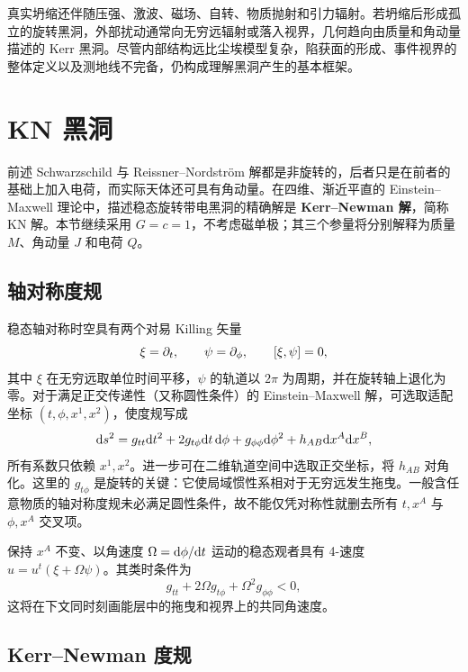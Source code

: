 真实坍缩还伴随压强、激波、磁场、自转、物质抛射和引力辐射。若坍缩后形成孤立的旋转黑洞，外部扰动通常向无穷远辐射或落入视界，几何趋向由质量和角动量描述的 Kerr 黑洞。尽管内部结构远比尘埃模型复杂，陷获面的形成、事件视界的整体定义以及测地线不完备，仍构成理解黑洞产生的基本框架。

\section{KN 黑洞}\label{sec:KN}

前述 Schwarzschild 与 Reissner--Nordstr\"om 解都是非旋转的，后者只是在前者的基础上加入电荷，而实际天体还可具有角动量。在四维、渐近平直的 Einstein--Maxwell 理论中，描述稳态旋转带电黑洞的精确解是 \textbf{Kerr--Newman 解}，简称 KN 解。本节继续采用 $G=c=1$，不考虑磁单极；其三个参量将分别解释为质量 $M$、角动量 $J$ 和电荷 $Q$。

\subsection{轴对称度规}

稳态轴对称时空具有两个对易 Killing 矢量
\[
    \xi=\partial_t,\qquad \psi=\partial_\phi,
    \qquad [\xi,\psi]=0,
\]
其中 $\xi$ 在无穷远取单位时间平移，$\psi$ 的轨道以 $2\pi$ 为周期，并在旋转轴上退化为零。对于满足正交传递性（又称圆性条件）的 Einstein--Maxwell 解，可选取适配坐标 $(t,\phi,x^1,x^2)$，使度规写成
\[
    \dd s^2=g_{tt}\dd t^2+2g_{t\phi}\dd t\,\dd\phi+g_{\phi\phi}\dd\phi^2
    +h_{AB}\dd x^A\dd x^B,
\]
所有系数只依赖 $x^1,x^2$。进一步可在二维轨道空间中选取正交坐标，将 $h_{AB}$ 对角化。这里的 $g_{t\phi}$ 是旋转的关键：它使局域惯性系相对于无穷远发生拖曳。一般含任意物质的轴对称度规未必满足圆性条件，故不能仅凭对称性就删去所有 $t,x^A$ 与 $\phi,x^A$ 交叉项。

保持 $x^A$ 不变、以角速度 $\Omega=\dd\phi/\dd t$ 运动的稳态观者具有 4-速度 $u=u^t(\xi+\Omega\psi)$。其类时条件为
\[
    g_{tt}+2\Omega g_{t\phi}+\Omega^2g_{\phi\phi}<0,
\]
这将在下文同时刻画能层中的拖曳和视界上的共同角速度。

\subsection{Kerr--Newman 度规}

